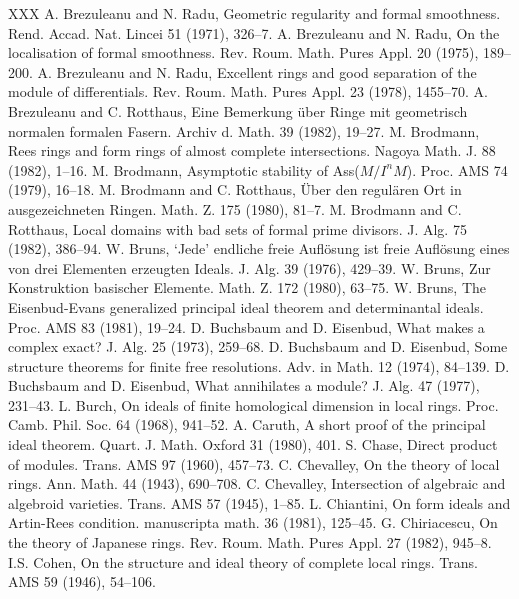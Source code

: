 \begin{thebibliography}{XXX}
 A. Brezuleanu and N. Radu, Geometric regularity and formal smoothness. Rend. Accad. Nat. Lincei 51 (1971), 326--7.
 A. Brezuleanu and N. Radu, On the localisation of formal smoothness. Rev. Roum. Math. Pures Appl. 20 (1975), 189--200.
 A. Brezuleanu and N. Radu, Excellent rings and good separation of the module of differentials. Rev. Roum. Math. Pures Appl. 23 (1978), 1455--70.
 A. Brezuleanu and C. Rotthaus, Eine Bemerkung \"uber Ringe mit geometrisch normalen formalen Fasern. Archiv d. Math. 39 (1982), 19--27.
 M. Brodmann, Rees rings and form rings of almost complete intersections. Nagoya Math. J. 88 (1982), 1--16.
 M. Brodmann, Asymptotic stability of Ass($M/I^nM$). Proc. AMS 74 (1979), 16--18.
 M. Brodmann and C. Rotthaus, \"Uber den regul\"aren Ort in ausgezeichneten Ringen. Math. Z. 175 (1980), 81--7.
 M. Brodmann and C. Rotthaus, Local domains with bad sets of formal prime divisors. J. Alg. 75 (1982), 386--94.
 W. Bruns, `Jede' endliche freie Aufl\"osung ist freie Aufl\"osung eines von drei Elementen erzeugten Ideals. J. Alg. 39 (1976), 429--39.
 W. Bruns, Zur Konstruktion basischer Elemente. Math. Z. 172 (1980), 63--75.
 W. Bruns, The Eisenbud-Evans generalized principal ideal theorem and determinantal ideals. Proc. AMS 83 (1981), 19--24.
 D. Buchsbaum and D. Eisenbud, What makes a complex exact? J. Alg. 25 (1973), 259--68.
 D. Buchsbaum and D. Eisenbud, Some structure theorems for finite free resolutions. Adv. in Math. 12 (1974), 84--139.
 D. Buchsbaum and D. Eisenbud, What annihilates a module? J. Alg. 47 (1977), 231--43.
 L. Burch, On ideals of finite homological dimension in local rings. Proc. Camb. Phil. Soc. 64 (1968), 941--52.
 A. Caruth, A short proof of the principal ideal theorem. Quart. J. Math. Oxford 31 (1980), 401.
 S. Chase, Direct product of modules. Trans. AMS 97 (1960), 457--73.
 C. Chevalley, On the theory of local rings. Ann. Math. 44 (1943), 690--708.
 C. Chevalley, Intersection of algebraic and algebroid varieties. Trans. AMS 57 (1945), 1--85.
 L. Chiantini, On form ideals and Artin-Rees condition. manuscripta math. 36 (1981), 125--45.
 G. Chiriacescu, On the theory of Japanese rings. Rev. Roum. Math. Pures Appl. 27 (1982), 945--8.
 I.S. Cohen, On the structure and ideal theory of complete local rings. Trans. AMS 59 (1946), 54--106.

\end{thebibliography}
